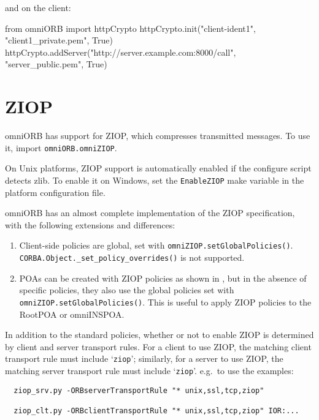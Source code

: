 \documentclass[11pt,oneside,a4paper]{book}
\newcommand{\code}[1]{\texttt{#1}}
\newcommand{\op}[1]{\texttt{#1()}}
\begin{document}
\noindent and on the client:

\begin{pylisting}
from omniORB import httpCrypto
httpCrypto.init("client-ident1", "client1_private.pem", True)
httpCrypto.addServer("http://server.example.com:8000/call",
                     "server_public.pem", True)
\end{pylisting}


\section{ZIOP}

omniORB has support for ZIOP, which compresses transmitted
messages. To use it, import \code{omniORB.omniZIOP}.

On Unix platforms, ZIOP support is automatically enabled if the
configure script detects zlib. To enable it on Windows, set the
\code{EnableZIOP} make variable in the platform configuration file.

omniORB has an almost complete implementation of the ZIOP
specification, with the following extensions and differences:

\begin{enumerate}
\item Client-side policies are global, set with
  \op{omniZIOP.setGlobalPolicies}.
  \op{CORBA.Object.\_set\_policy\_overrides} is not supported.

\item POAs can be created with ZIOP policies as shown in
  , but in the absence of specific
  policies, they also use the global policies set with
  \op{omniZIOP.setGlobalPolicies}.  This is useful to apply ZIOP
  policies to the RootPOA or omniINSPOA.
\end{enumerate}

\noindent In addition to the standard policies, whether or not to
enable ZIOP is determined by client and server transport rules. For a
client to use ZIOP, the matching client transport rule must include
`\code{ziop}'; similarly, for a server to use ZIOP, the matching
server transport rule must include `\code{ziop}'. e.g.\ to use the
examples:

\begin{verbatim}
  ziop_srv.py -ORBserverTransportRule "* unix,ssl,tcp,ziop"

  ziop_clt.py -ORBclientTransportRule "* unix,ssl,tcp,ziop" IOR:...
\end{verbatim}
\end{document}
